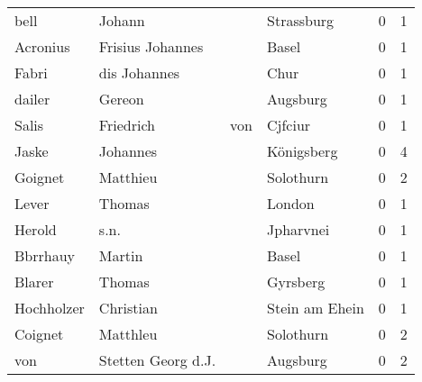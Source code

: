 \begin{center}
\begin{tiny}
\begin{longtabu}{llllrr}
                     bell &                             Johann &             &                                  Strassburg &          0 &         1 \\
                 Acronius &                   Frisius Johannes &             &                                       Basel &          0 &         1 \\
                    Fabri &                       dis Johannes &             &                                        Chur &          0 &         1 \\
                   dailer &                             Gereon &             &                                    Augsburg &          0 &         1 \\
                    Salis &                          Friedrich &         von &                                     Cjfciur &          0 &         1 \\
                    Jaske &                           Johannes &             &                                  Königsberg &          0 &         4 \\
                  Goignet &                           Matthieu &             &                                   Solothurn &          0 &         2 \\
                    Lever &                             Thomas &             &                                      London &          0 &         1 \\
                   Herold &                               s.n. &             &                                   Jpharvnei &          0 &         1 \\
                 Bbrrhauy &                             Martin &             &                                       Basel &          0 &         1 \\
                   Blarer &                             Thomas &             &                                    Gyrsberg &          0 &         1 \\
               Hochholzer &                          Christian &             &                              Stein am Ehein &          0 &         1 \\
                  Coignet &                           Matthleu &             &                                   Solothurn &          0 &         2 \\
                      von &                 Stetten Georg d.J. &             &                                    Augsburg &          0 &         2 \\

\end{longtabu}
\end{tiny}
\end{center}

